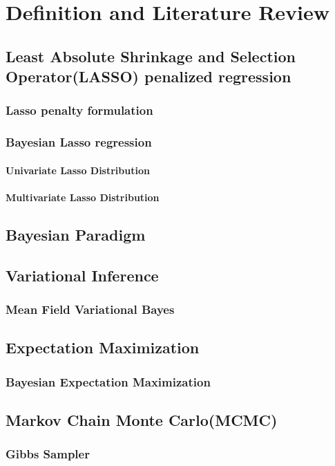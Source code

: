 \chapter{Definition and Literature Review}
\label{Chapter2}
\section{Least Absolute Shrinkage and Selection Operator(LASSO) penalized regression}
\subsection{Lasso penalty formulation}
\subsection{Bayesian Lasso regression}
\subsubsection{Univariate Lasso Distribution}
\subsubsection{Multivariate Lasso Distribution}


\section{Bayesian Paradigm}
\section{Variational Inference}
\subsection{Mean Field Variational Bayes}

\section{Expectation Maximization}
\subsection{Bayesian Expectation Maximization}

\section{Markov Chain Monte Carlo(MCMC)}
\subsection{Gibbs Sampler}







